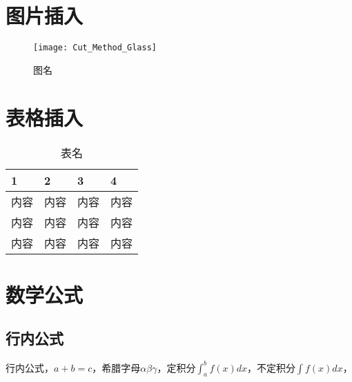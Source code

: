 \documentclass[a4paper,AutoFakeBold={2.7}]{ctexart} %
\begin{document}
\section{图片插入}
\begin{figure}[htbp]
	\centering
	\texttt{[image: Cut\_Method\_Glass]}
	\caption{图名}\label{图名}
\end{figure}
\section{表格插入}
\begin{table}[htbp]%
	\caption{表名}\label{表名}
	\centering
	\begin{tabular}{p{3cm}<{\centering} p{3cm}<{\centering} p{3cm}<{\centering} p{3cm}<{\centering}}
		\toprule[1.5pt]
		1&2&3&4\\
		\midrule[0.75pt]
		内容&内容&内容&内容\\
		内容&内容&内容&内容\\
		内容&内容&内容&内容\\
		\bottomrule[1pt]
	\end{tabular}
\end{table}
\section{数学公式}
\subsection{行内公式}
行内公式，$a+b=c$，希腊字母$\alpha\beta\gamma$，定积分$\int_{a}^{b} f(x)dx$，不定积分$\int f(x)dx$，
\end{document}
